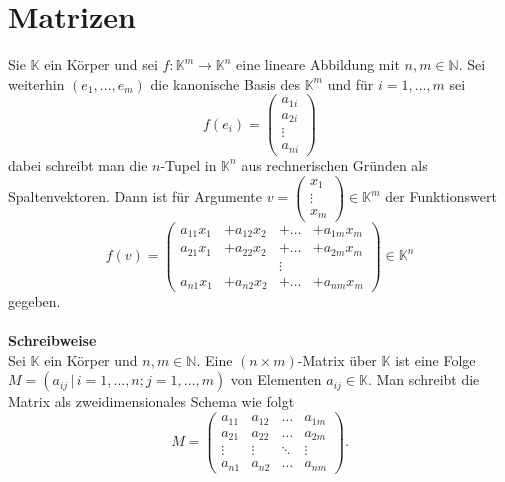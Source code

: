 \documentclass[a4paper,12pt]{article}
\numberwithin{equation}{section}
\begin{document}
\section{Matrizen}   
Sie $\mathbb{K}$ ein Körper und sei $f:\mathbb{K}^{m}\rightarrow \mathbb{K}^{n}$ eine lineare Abbildung mit $n,m \in \mathbb{N}$. Sei weiterhin $\left(e_1,\hdots ,e_m\right)$ die kanonische Basis des $\mathbb{K}^{m}$ und für $i=1,\hdots ,m$ sei
\[ 
        f\left(e_i\right)=\left(\begin{matrix}
                a_{1i}\\a_{2i}\\\vdots\\a_{n i}
        \end{matrix}\right)
\] 
dabei schreibt man die $n$-Tupel in $\mathbb{K}^{n}$ aus rechnerischen Gründen als Spaltenvektoren. Dann ist für Argumente $v=\left(\begin{matrix}
        x_1\\\vdots\\x_m
\end{matrix}\right) \in \mathbb{K}^{m}$ der Funktionswert
\[ 
        f\left(v\right)=\left(\begin{matrix}
                        a_{11}x_1&+a_{12}x_2&+\hdots &+a_{1m}x_m\\
                        a_{21}x_1&+a_{22}x_2&+\hdots &+a_{2m}x_m\\
                                 &&\vdots&\\
                        a_{n1}x_1&+a_{n2}x_2&+\hdots &+a_{nm}x_m
        \end{matrix}\right) \in \mathbb{K}^{n}
\] 
gegeben.
\\\hfill\\\textbf{Schreibweise}\\ 
Sei $\mathbb{K}$ ein Körper und $n,m \in \mathbb{N}$. Eine $\left(n\times m\right)$-Matrix über $\mathbb{K}$ ist eine Folge $M=\left(a_{ij}\,|\, i=1,\hdots ,n;j=1,\hdots ,m\right)$ von Elementen $a_{ij} \in \mathbb{K}$. Man schreibt die Matrix als zweidimensionales Schema wie folgt
\[ 
        M=\left(\begin{matrix}
                        a_{11}&a_{12}&\hdots &a_{1m}\\
                        a_{21}&a_{22}&\hdots &a_{2m}\\
                        \vdots&\vdots&\ddots &\vdots\\
                        a_{n1}&a_{n2}&\hdots &a_{nm}
        \end{matrix}\right)
.\] 
\end{document}
